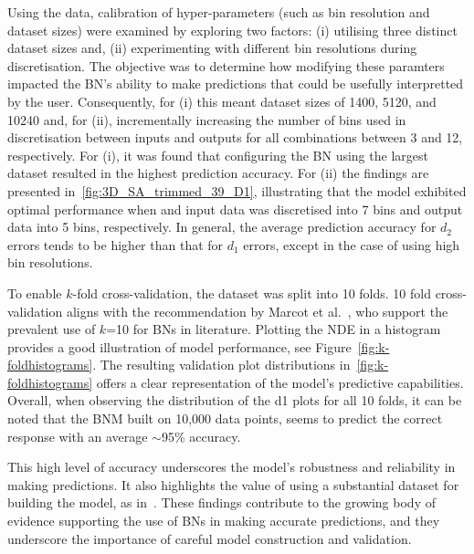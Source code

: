 \documentclass[journal]{IEEEtran}
\begin{document}
Using the data, calibration of hyper-parameters (such as bin resolution and dataset sizes) were examined by exploring two factors: (i) utilising three distinct dataset sizes and, (ii) experimenting with different bin resolutions during discretisation. The objective was to determine how modifying these paramters impacted the BN's ability to make predictions that could be usefully interpretted by the user. Consequently, for (i) this meant dataset sizes of 1400, 5120, and 10240 and, for (ii), incrementally increasing the number of bins used in discretisation between inputs and outputs for all combinations between 3 and 12, respectively. For (i), it was found that configuring the BN using the largest dataset resulted in the highest prediction accuracy. For (ii) the findings are presented in~\ref{fig:3D_SA_trimmed_39_D1}, illustrating that the model exhibited optimal performance when and input data was discretised into 7 bins and output data into 5 bins, respectively. In general, the average prediction accuracy for $d_{2}$ errors tends to be higher than that for $d_{1}$ errors, except in the case of using high bin resolutions.

To enable $k$-fold cross-validation, the dataset was split into 10 folds. 10 fold cross-validation aligns with the recommendation by Marcot et al.~\cite{Marcot2021}, who support the prevalent use of $k$=10 for BNs in literature. Plotting the NDE in a histogram provides a good illustration of model performance, see Figure~\ref{fig:k-foldhistograms}. The resulting validation plot distributions in~\ref{fig:k-foldhistograms} offers a clear representation of the model's predictive capabilities. Overall, when observing the distribution of the d1 plots for all 10 folds, it can be noted that the BNM built on 10,000 data points, seems to predict the correct response with an average $\sim$95\% accuracy.

This high level of accuracy underscores the model's robustness and reliability in making predictions. It also highlights the value of using a substantial dataset for building the model, as in~\cite{Griffiths2024}. These findings contribute to the growing body of evidence supporting the use of BNs in making accurate predictions, and they underscore the importance of careful model construction and validation.
\end{document}

